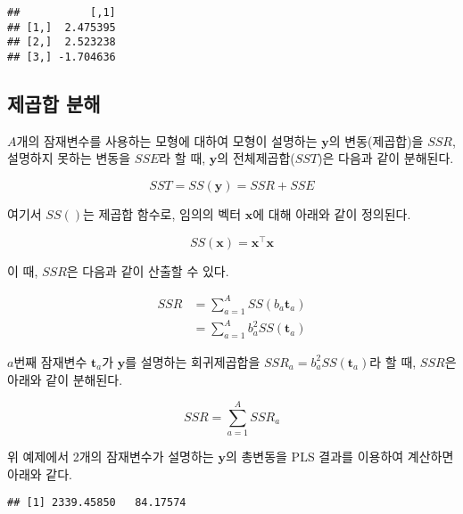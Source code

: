 \documentclass[
]{book}
\newenvironment{Shaded}{\begin{snugshade}}{\end{snugshade}}
\newcommand{\DecValTok}[1]{\textcolor[rgb]{0.00,0.00,0.81}{#1}}
\newcommand{\FunctionTok}[1]{\textcolor[rgb]{0.00,0.00,0.00}{#1}}
\newcommand{\NormalTok}[1]{#1}
\newcommand{\OtherTok}[1]{\textcolor[rgb]{0.56,0.35,0.01}{#1}}
\newcommand{\SpecialCharTok}[1]{\textcolor[rgb]{0.00,0.00,0.00}{#1}}
\begin{document}
\begin{verbatim}
##           [,1]
## [1,]  2.475395
## [2,]  2.523238
## [3,] -1.704636
\end{verbatim}

\hypertarget{plsr-sst}{%
\subsection{제곱합 분해}\label{plsr-sst}}

\(A\)개의 잠재변수를 사용하는 모형에 대하여 모형이 설명하는 \(\mathbf{y}\)의 변동(제곱합)을 \({SSR}\), 설명하지 못하는 변동을 \({SSE}\)라 할 때, \(\mathbf{y}\)의 전체제곱합(\({SST}\))은 다음과 같이 분해된다.

\[{SST} = {SS}(\mathbf{y}) = {SSR} + {SSE}\]

여기서 \({SS}()\)는 제곱합 함수로, 임의의 벡터 \(\mathbf{x}\)에 대해 아래와 같이 정의된다.

\[
{SS}(\mathbf{x}) = \mathbf{x}^\top \mathbf{x}
\]

이 때, \({SSR}\)은 다음과 같이 산출할 수 있다.

\begin{equation}
\begin{split}
SSR &= \sum_{a = 1}^{A} SS(b_a \mathbf{t}_a)\\
&= \sum_{a = 1}^{A} b_a^2 SS(\mathbf{t}_a)
\end{split} \label{eq:plsr-ssr}
\end{equation}

\(a\)번째 잠재변수 \(\mathbf{t}_a\)가 \(\mathbf{y}\)를 설명하는 회귀제곱합을 \(SSR_a = b_a^2 SS(\mathbf{t}_a)\)라 할 때, \(SSR\)은 아래와 같이 분해된다.

\[
SSR = \sum_{a = 1}^{A} SSR_a
\]

위 예제에서 2개의 잠재변수가 설명하는 \(\mathbf{y}\)의 총변동을 PLS 결과를 이용하여 계산하면 아래와 같다.

\begin{Shaded}
\end{Shaded}

\begin{verbatim}
## [1] 2339.45850   84.17574
\end{verbatim}
\end{document}
